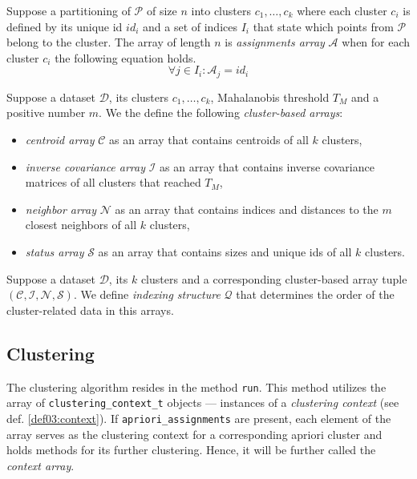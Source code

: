 \begin{defn}
	Suppose a partitioning of $\mathcal{P}$ of size $n$ into clusters $c_1,\dots,c_k$ where each cluster $c_i$ is defined by its unique id $id_i$ and a set of indices $I_i$ that state which points from $\mathcal{P}$ belong to the cluster. The array of length $n$ is \emph{assignments array} $\mathcal{A}$ when for each cluster $c_i$ the following equation holds.
	$${\forall j \in I_i : \mathcal{A}_j = id_i}$$
	\label{def03:assign}
\end{defn}

\begin{defn}
	Suppose a dataset $\mathcal{D}$, its clusters $c_1,\dots,c_k$,  Mahalanobis threshold $T_M$ and a positive number $m$. We the define the following \emph{cluster-based arrays}:
	\begin{itemize}
		\item \emph{centroid array} $\mathcal{C}$ as an array that contains centroids of all $k$ clusters,
		\item \emph{inverse covariance array} $\mathcal{I}$ as an array that contains inverse covariance matrices of all clusters that reached $T_M$,
		\item \emph{neighbor array} $\mathcal{N}$ as an array that contains indices and distances to the $m$ closest neighbors of all $k$ clusters,
		\item \emph{status array} $\mathcal{S}$ as an array that contains sizes and unique ids of all $k$ clusters.
	\end{itemize}
	\label{def03:tuple}
\end{defn}

\begin{defn}
	Suppose a dataset $\mathcal{D}$, its $k$ clusters and a corresponding cluster-based array tuple $(\mathcal{C},\mathcal{I},\mathcal{N},\mathcal{S})$. We define \emph{indexing structure} $\mathcal{Q}$ that determines the order of the cluster-related data in this arrays.
	\label{def03:index}
\end{defn}

\subsection{Clustering}
The clustering algorithm resides in the method \texttt{run}. This method utilizes the array of \texttt{clustering\_context\_t} objects --- instances of a \emph{clustering context} (see def. \ref{def03:context}). If \texttt{apriori\_assignments} are present, each element of the array serves as the clustering context for a corresponding apriori cluster and holds methods for its further clustering. Hence, it will be further called the \emph{context array}. 

